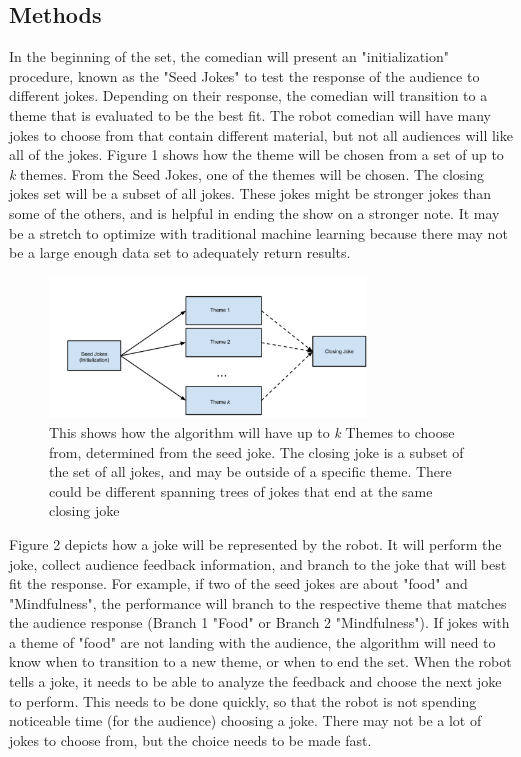 \documentclass[onecolumn, draftclsnofoot,10pt, compsoc]{IEEEtran}
\begin{document}
\subsection{Methods}
In the beginning of the set, the comedian will present an "initialization" procedure, known as the "Seed Jokes" to test the response of the audience to different jokes. Depending on their response, the comedian will transition to a theme that is evaluated to be the best fit. The robot comedian will have many jokes to choose from that contain different material, but not all audiences will like all of the jokes. Figure 1 shows how the theme will be chosen from a set of up to \textit{k} themes. From the Seed Jokes, one of the themes will be chosen. The closing jokes set will be a subset of all jokes. These jokes might be stronger jokes than some of the others, and is helpful in ending the show on a stronger note. It may be a stretch to optimize with traditional machine learning because there may not be a large enough data set to adequately return results.

\begin{figure}[H]
  \centering
  \includegraphics[width=0.75\textwidth,height=0.75\textheight,keepaspectratio]{fig0}
  \caption{This shows how the algorithm will have up to \textit{k} Themes to choose from, determined from the seed joke. The closing joke is a subset of the set of all jokes, and may be outside of a specific theme. There could be different spanning trees of jokes that end at the same closing joke}
\end{figure}

Figure 2 depicts how a joke will be represented by the robot. It will perform the joke, collect audience feedback information, and branch to the joke that will best fit the response. For example, if two of the seed jokes are about "food" and "Mindfulness", the performance will branch to the respective theme that matches the audience response (Branch 1 "Food" or Branch 2 "Mindfulness"). If jokes with a theme of "food" are not landing with the audience, the algorithm will need to know when to transition to a new theme, or when to end the set. When the robot tells a joke, it needs to be able to analyze the feedback and choose the next joke to perform. This needs to be done quickly, so that the robot is not spending noticeable time (for the audience) choosing a joke. There may not be a lot of jokes to choose from, but the choice needs to be made fast.
\end{document}
